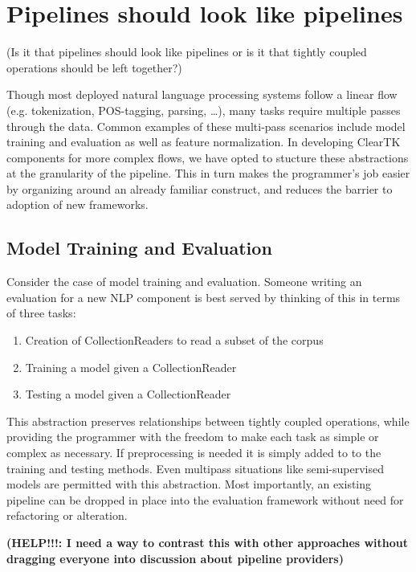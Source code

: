 \documentclass[10pt, a4paper]{article}
\begin{document}
\section{Pipelines should look like pipelines}

(Is it that pipelines should look like pipelines or is it that tightly coupled operations should be left together?)

Though most deployed natural language processing systems follow a linear flow (e.g. tokenization, POS-tagging, parsing, \ldots), many tasks require multiple passes through the data.  Common examples of these multi-pass scenarios include model training and evaluation as well as feature normalization.  In developing ClearTK components for more complex flows, we have opted to stucture these abstractions at the granularity of the pipeline.  This in turn makes the programmer's job easier by organizing around an already familiar construct, and reduces the barrier to adoption of new frameworks.

\subsection{Model Training and Evaluation}
Consider the case of model training and evaluation.  Someone writing an evaluation for a new NLP component is best served by thinking of this in terms of three tasks:

\begin{enumerate}
\item Creation of CollectionReaders to read a subset of the corpus
\item Training a model given a CollectionReader
\item Testing a model given a CollectionReader
\end{enumerate}


This abstraction preserves relationships between tightly coupled operations, while providing the programmer with the freedom to make each task as simple or complex as necessary.  If preprocessing is needed it is simply added to to the training and testing methods.  Even multipass situations like semi-supervised models are permitted with this abstraction.  Most importantly, an existing pipeline can be dropped in place into the evaluation framework without need for refactoring or alteration.

\textbf{(HELP!!!: I need a way to contrast this with other approaches without dragging everyone into discussion about pipeline providers)}
\end{document}
